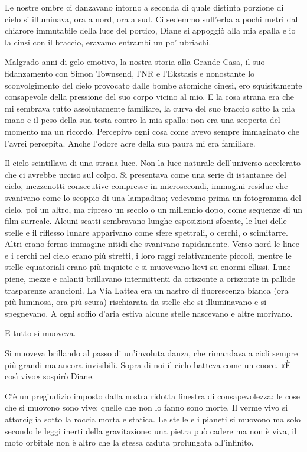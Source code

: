 Le nostre ombre ci danzavano intorno a seconda di quale distinta
porzione di cielo si illuminava, ora a nord, ora a sud. Ci sedemmo
sull'erba a pochi metri dal chiarore immutabile della luce del portico,
Diane si appoggiò alla mia spalla e io la cinsi con il braccio, eravamo
entrambi un po' ubriachi.

Malgrado anni di gelo emotivo, la nostra storia alla Grande Casa, il suo
fidanzamento con Simon Townsend, l'NR e l'Ekstasis e nonostante lo
sconvolgimento del cielo provocato dalle bombe atomiche cinesi, ero
squisitamente consapevole della pressione del suo corpo vicino al mio. E
la cosa strana era che mi sembrava tutto assolutamente familiare, la
curva del suo braccio sotto la mia mano e il peso della sua testa contro
la mia spalla: non era una scoperta del momento ma un ricordo. Percepivo
ogni cosa come avevo sempre immaginato che l'avrei percepita. Anche
l'odore acre della sua paura mi era familiare.

Il cielo scintillava di una strana luce. Non la luce naturale
dell'universo accelerato che ci avrebbe ucciso sul colpo. Si presentava
come una serie di istantanee del cielo, mezzenotti consecutive compresse
in microsecondi, immagini residue che svanivano come lo scoppio di una
lampadina; vedevamo prima un fotogramma del cielo, poi un altro, ma
ripreso un secolo o un millennio dopo, come sequenze di un film
surreale. Alcuni scatti sembravano lunghe esposizioni sfocate, le luci
delle stelle e il riflesso lunare apparivano come sfere spettrali, o
cerchi, o scimitarre. Altri erano fermo immagine nitidi che svanivano
rapidamente. Verso nord le linee e i cerchi nel cielo erano più stretti,
i loro raggi relativamente piccoli, mentre le stelle equatoriali erano
più inquiete e si muovevano lievi su enormi ellissi. Lune piene, mezze e
calanti brillavano intermittenti da orizzonte a orizzonte in pallide
trasparenze arancioni. La Via Lattea era un nastro di fluorescenza
bianca (ora più luminosa, ora più scura) rischiarata da stelle che si
illuminavano e si spegnevano. A ogni soffio d'aria estiva alcune stelle
nascevano e altre morivano.

E tutto si muoveva.

Si muoveva brillando al passo di un'involuta danza, che rimandava a
cicli sempre più grandi ma ancora invisibili. Sopra di noi il cielo
batteva come un cuore. «È così vivo» sospirò Diane.

C'è un pregiudizio imposto dalla nostra ridotta finestra di
consapevolezza: le cose che si muovono sono vive; quelle che non lo
fanno sono morte. Il verme vivo si attorciglia sotto la roccia morta e
statica. Le stelle e i pianeti si muovono ma solo secondo le leggi
inerti della gravitazione: una pietra può cadere ma non è viva, il moto
orbitale non è altro che la stessa caduta prolungata all'infinito.

